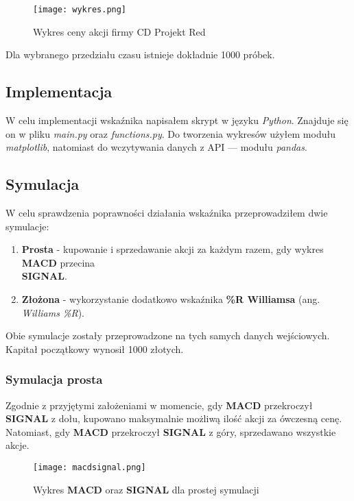 \documentclass{article}
\begin{document}
    \begin{figure}[H]
        \texttt{[image: wykres.png]}
        \centering
        \caption{Wykres ceny akcji firmy CD Projekt Red}
    \end{figure}

    Dla wybranego przedziału czasu istnieje dokładnie 1000 próbek.

    \subsection{Implementacja}

    W celu implementacji wskaźnika napisałem skrypt w języku \textit{Python}.
    Znajduje się on w pliku \textit{main.py} oraz \textit{functions.py}. Do tworzenia wykresów
    użyłem modułu \textit{matplotlib}, natomiast do wczytywania danych z API --- modułu \textit{pandas}.
    \subsection{Symulacja}
    W celu sprawdzenia poprawności działania wskaźnika przeprowadziłem dwie symulacje:
    \begin{enumerate}
        \item \textbf{Prosta} - kupowanie i sprzedawanie akcji za każdym razem, gdy wykres \textbf{MACD} przecina \\ \textbf{SIGNAL}.
        \item \textbf{Złożona} - wykorzystanie dodatkowo wskaźnika \textbf{\%R Williamsa} (ang. \textit{Williams \%R}).
    \end{enumerate}
   
    Obie symulacje zostały przeprowadzone na tych samych danych wejściowych. Kapitał początkowy wynosił 1000 złotych. 

    \subsubsection{Symulacja prosta}

    Zgodnie z przyjętymi założeniami w momencie, gdy \textbf{MACD} przekroczył \textbf{SIGNAL} z dołu, kupowano maksymalnie możliwą ilość akcji 
    za ówczesną cenę.
    Natomiast, gdy \textbf{MACD} przekroczył \textbf{SIGNAL} z góry, sprzedawano wszystkie akcje.
    
    \begin{figure}[H]
        \texttt{[image: macdsignal.png]}
        \centering
        \caption{Wykres \textbf{MACD} oraz \textbf{SIGNAL} dla prostej symulacji}
    \end{figure}
\end{document}
